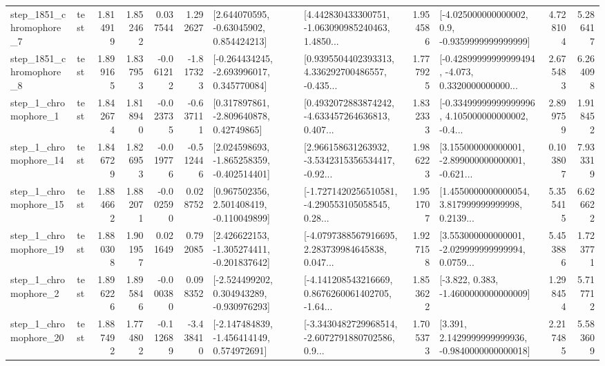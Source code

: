 \begin{tabular}{llrrrrllrlrr}
  step\_1851\_chromophore\_7 &      test &      1.814919 &    1.852462 &      0.037544 &  1.292627 &     [2.644070595, -0.63045902, 0.854424213] &  [4.442830433300751, -1.063090985240463, 1.4850... &       1.954586 &     [-4.025000000000002, 0.9, -0.9359999999999999] &            4.728104 &          5.286417 \\
  step\_1851\_chromophore\_8 &      test &      1.899165 &    1.837953 &     -0.061212 & -1.817323 &   [-0.264434245, -2.693996017, 0.345770084] &  [0.9395504402393313, 4.336292700486557, -0.435... &       1.777925 &  [-0.42899999999999494, -4.073, 0.3320000000000... &            2.675483 &          6.264098 \\
     step\_1\_chromophore\_1 &      test &      1.842674 &    1.818940 &     -0.023735 & -0.637111 &     [0.317897861, -2.809640878, 0.42749865] &  [0.4932072883874242, -4.633457264636813, 0.407... &       1.832333 &  [-0.33499999999999996, 4.105000000000002, -0.4... &            2.899759 &          1.918452 \\
    step\_1\_chromophore\_14 &      test &      1.846729 &    1.826953 &     -0.019776 & -0.512446 &   [2.024598693, -1.865258359, -0.402514401] &  [2.966158631263932, -3.5342315356534417, -0.92... &       1.986223 &  [3.155000000000001, -2.899000000000001, -0.621... &            0.103807 &          7.933319 \\
    step\_1\_chromophore\_15 &      test &      1.884662 &    1.882071 &     -0.002590 &  0.028752 &    [0.967502356, 2.501408419, -0.110049899] &  [-1.7271420256510581, -4.290553105058545, 0.28... &       1.951707 &  [1.4550000000000054, 3.817999999999998, 0.2139... &            5.355415 &          6.626622 \\
    step\_1\_chromophore\_19 &      test &      1.880308 &    1.901957 &      0.021649 &  0.792085 &   [2.426622153, -1.305274411, -0.201837642] &  [-4.0797388567916695, 2.283739984645838, 0.047... &       1.927158 &  [3.553000000000001, -2.029999999999994, 0.0759... &            5.453886 &          1.723771 \\
     step\_1\_chromophore\_2 &      test &      1.896226 &    1.895846 &     -0.000380 &  0.098352 &   [-2.524499202, 0.304943289, -0.930976293] &  [-4.141208543216669, 0.8676260061402705, -1.64... &       1.853622 &               [-3.822, 0.383, -1.4600000000000009] &            1.298454 &          5.717712 \\
    step\_1\_chromophore\_20 &      test &      1.887492 &    1.774802 &     -0.112689 & -3.438410 &   [-2.147484839, -1.456414149, 0.574972691] &  [-3.3430482729968514, -2.6072791880702586, 0.9... &       1.705373 &   [3.391, 2.1429999999999936, -0.9840000000000018] &            2.217485 &          5.583609 \\

\end{tabular}
